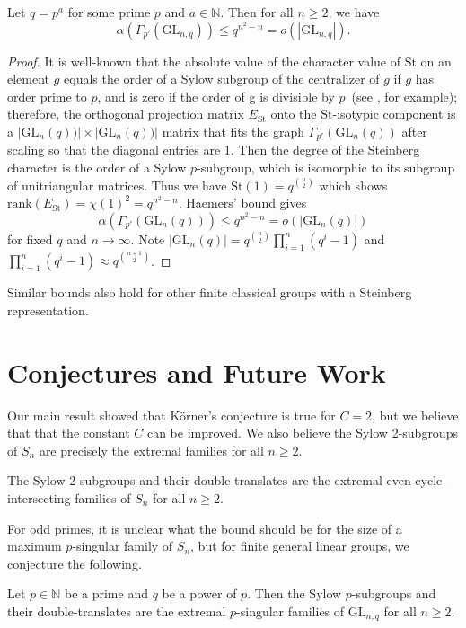 \documentclass[12pt]{article}
\begin{document}
\begin{theorem}
Let $q=p^a$ for some prime $p$ and $a \in \mathbb{N}$. Then for all $n \geq 2$, we have 
$$\alpha (\Gamma_{p'}(\mathrm{GL}_{n,q})) \leq q^{n^2-n} = o(|\mathrm{GL}_{n,q}|).$$
\end{theorem}
\begin{proof}
 It is well-known that the absolute value of the character value of $\mathrm{St}$ on an element $g$ equals the order of a Sylow subgroup of the centralizer of $g$ if $g$ has order prime to $p$, and is zero if the order of g is divisible by $p$~(see \cite{Humphreys87}, for example); therefore, the orthogonal projection matrix $E_{\mathrm{St}}$ onto the $\mathrm{St}$-isotypic component is a $|\mathrm{GL}_n(q))| \times |\mathrm{GL}_n(q))|$ matrix that fits the graph $\Gamma_{p'}(\mathrm{GL}_n(q))$ after scaling so that the diagonal entries are 1.  Then the degree of the Steinberg character is the order of a Sylow $p$-subgroup, which is isomorphic to its subgroup of unitriangular matrices. Thus we have $\mathrm{St}(1) = q^{\binom{n}{2}}$ which shows $\mathrm{rank}(E_{\mathrm{St}}) = \chi(1)^2 = q^{n^2-n}$. Haemers' bound gives 
$$\alpha(\Gamma_{p'}(\mathrm{GL}_n(q))) \leq q^{n^2-n} = o(|\mathrm{GL}_n(q)|)$$
for fixed $q$ and $n \rightarrow \infty$. Note $|\mathrm{GL}_n(q)| = q^{\binom{n}{2}}\prod_{i=1}^n (q^i-1)$ and $\prod_{i=1}^n (q^i-1) \approx q^{\binom{n+1}{2}}$.
\end{proof}

\noindent Similar bounds also hold for other finite classical groups with a Steinberg representation. 

\section{Conjectures and Future Work}
Our main result showed that K\"orner's conjecture is true for $C = 2$, but we believe that that the constant $C$ can be improved. 
We also believe the Sylow 2-subgroups of $S_n$ are precisely the extremal families for all $n \geq 2$. 
\begin{conjecture}\label{con:main}
The Sylow 2-subgroups and their double-translates are the extremal even-cycle-intersecting families of $S_n$ for all $n \geq 2$. 
\end{conjecture}
\noindent For odd primes, it is unclear what the bound should be for the size of a maximum $p$-singular family of $S_n$, but for finite general linear groups, we conjecture the following.
\begin{conjecture}
Let $p \in \mathbb{N}$ be a prime and $q$ be a power of $p$. Then the Sylow $p$-subgroups and their double-translates are the extremal $p$-singular families of $\mathrm{GL}_{n,q}$ for all $n \geq 2$. 
\end{conjecture}
\end{document}
